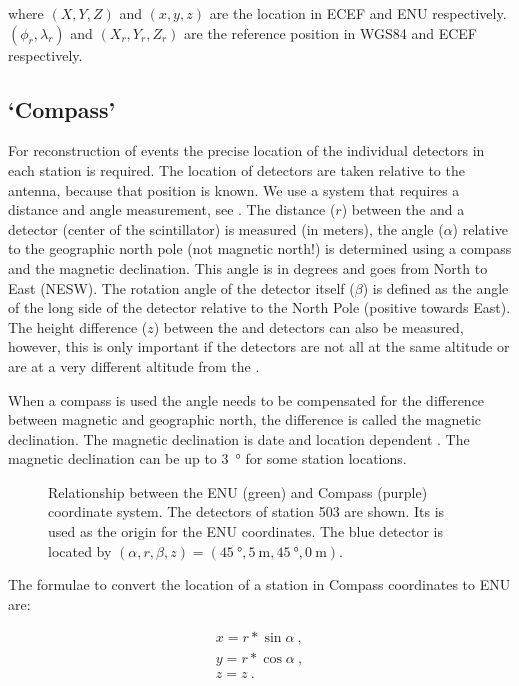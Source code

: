 \noindent where $(X, Y, Z)$ and $(x, y, z)$ are the location in ECEF and
ENU respectively. $(\phi_r, \lambda_r)$ and $(X_r, Y_r, Z_r)$ are the
reference position in WGS84 and ECEF respectively.


\subsection{`Compass'}

For reconstruction of events the precise location of the individual
detectors in each station is required. The location of detectors are
taken relative to the \gps antenna, because that position is known. We
use a system that requires a distance and angle measurement, see
. The distance ($r$) between the \gps and a
detector (center of the scintillator) is measured (in meters), the angle
($\alpha$) relative to the geographic north pole (not magnetic north!)
is determined using a compass and the magnetic declination. This angle
is in degrees and goes from North to East (NESW). The rotation angle of
the detector itself ($\beta$) is defined as the angle of the long side
of the detector relative to the North Pole (positive towards East). The
height difference ($z$) between the \gps and detectors can also be
measured, however, this is only important if the detectors are not all
at the same altitude or are at a very different altitude from the \gps.

When a compass is used the angle needs to be compensated for the
difference between magnetic and geographic north, the difference is
called the magnetic declination. The magnetic declination is date and
location dependent \cite{canada:2013aa}. The magnetic declination can be
up to \SI{3}{\degree} for some \hisparc station locations.

\begin{figure}
    \centering
    
    \caption{Relationship between the ENU (green) and Compass (purple)
             coordinate system. The detectors of station 503 are shown.
             Its \gps is used as the origin for the ENU coordinates.
             The blue detector is located by $(\alpha,r,\beta,z) =
             (\SI{45}{\degree},\SI{5}{\meter},\SI{45}{\degree},
              \SI{0}{\meter})$.}
    \label{fig:enu_compass}
\end{figure}

The formulae to convert the location of a station in Compass coordinates
to ENU are:

\begin{equation}
    \begin{array}{l}
        x = r * \sin{\alpha} \ , \\
        y = r * \cos{\alpha} \ , \\
        z = z \ .
    \end{array}
\end{equation}


